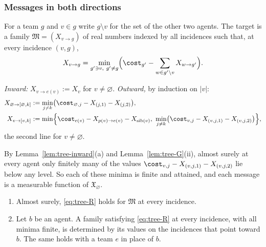 \subsubsection*{Messages in both directions}

For a team $g$ and $v\in g$ write $g\setminus v$ for the set of the other two agents. The
target is a family $\mathfrak{M}=(X_{v\to g})$ of real numbers indexed by all incidences such
that, at every incidence $(v,g)$,
\begin{equation}\label{eq:tree-R}
  X_{v\to g}=\min_{g'\ni v,\ g'\neq g}\Bigl(\cost_{g'}-\sum_{w\in g'\setminus v}X_{w\to g'}\Bigr).
\end{equation}

\begin{definition}\label{def:tree-messages}
\emph{Inward:} $X_{v\to e(v)}:=X_v$ for $v\ne\varnothing$. \emph{Outward,} by induction on
$|v|$:
\begin{align*}
  X_{\varnothing\to[\varnothing,k]}&:=\min_{j\ne k}\bigl(\cost_{\varnothing,j}-X_{(j,1)}-X_{(j,2)}\bigr),\\
  X_{v\to[v,k]}&:=\min\Bigl\{\cost_{e(v)}-X_{p(v)\to e(v)}-X_{\operatorname{sib}(v)},\
     \min_{j\ne k}\bigl(\cost_{v,j}-X_{(v,j,1)}-X_{(v,j,2)}\bigr)\Bigr\},
\end{align*}
the second line for $v\ne\varnothing$.
\end{definition}

By Lemma~\ref{lem:tree-inward}(a) and Lemma~\ref{lem:tree-G}(ii), almost surely at every agent
only finitely many of the values $\cost_{v,j}-X_{(v,j,1)}-X_{(v,j,2)}$ lie below any level. So
each of these minima is finite and attained, and each message is a measurable function of
$\mathfrak{X}_\varnothing$.

\begin{lemma}\label{lem:tree-messages}
\begin{enumerate}
\item[(i)] Almost surely, \eqref{eq:tree-R} holds for $\mathfrak{M}$ at every incidence.
\item[(ii)] Let $b$ be an agent. A family satisfying \eqref{eq:tree-R} at every incidence,
with all minima finite, is determined by its values on the incidences that point toward $b$.
The same holds with a team $e$ in place of $b$.
\end{enumerate}
\end{lemma}

